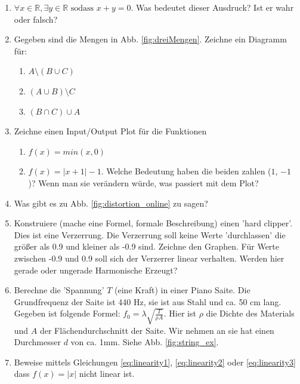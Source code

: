 \begin{enumerate}
    \item $\forall x \in \mathbb{R}, \exists y \in \mathbb{R} \text{ sodass } x + y = 0$. Was bedeutet dieser Ausdruck? Ist er wahr oder falsch?
    \item Gegeben sind die Mengen in Abb. \ref{fig:dreiMengen}. Zeichne ein Diagramm für:
    \begin{enumerate} %
        \item $A \setminus (B \cup C)$
        \item $(A \cup B) \setminus C$
        \item $(B \cap C) \cup A$
    \end{enumerate}
    \item Zeichne einen Input/Output Plot für die Funktionen 
    \begin{enumerate} %
        \item $f(x) = min(x, 0)$
        \item $f(x) = |x+1|-1$. Welche Bedeutung haben die beiden zahlen ($1$, $-1$ )? Wenn man sie verändern würde, was passiert mit dem Plot?
    \end{enumerate}
    \item Was gibt es zu Abb. \ref{fig:distortion_online} zu sagen?
    \item Konstruiere (mache eine Formel, formale Beschreibung) einen 'hard clipper'. Dies ist eine Verzerrung. Die Verzerrung soll keine Werte 'durchlassen' die größer als 0.9 und kleiner als -0.9 sind. Zeichne den Graphen. Für Werte zwischen -0.9 und 0.9 soll sich der Verzerrer linear verhalten. Werden hier gerade oder ungerade Harmonische Erzeugt?
    \item Berechne die 'Spannung' $T$ (eine Kraft) in einer Piano Saite. Die Grundfrequenz der Saite ist 440 Hz, sie ist aus Stahl und ca. 50 cm lang. Gegeben ist folgende Formel: $f_0 = \lambda \sqrt{\frac{T}{\rho A}}$. Hier ist $\rho$ die Dichte des Materials und $A$ der Flächendurchschnitt der Saite. Wir nehmen an sie hat einen Durchmesser $d$ von ca. 1mm. Siehe Abb. \ref{fig:string_ex}.

    \item Beweise mittels Gleichungen \ref{eq:linearity1}, \ref{eq:linearity2} oder \ref{eq:linearity3} dass $f(x)=|x|$ nicht linear ist.



\end{enumerate}

